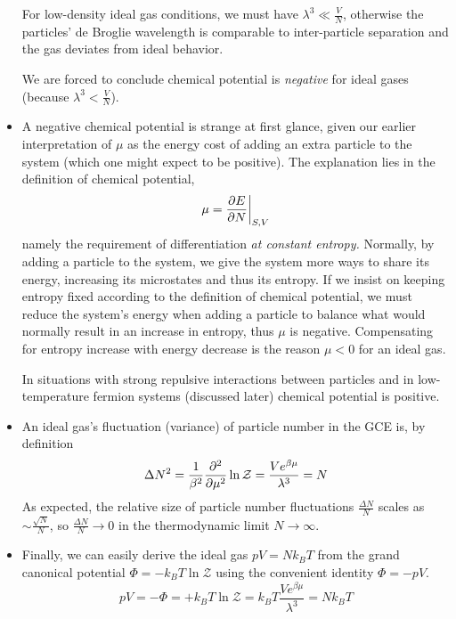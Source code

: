 \documentclass[11pt, a4paper]{article}
\begin{document}
\begin{itemize}
	For low-density ideal gas conditions, we must have $ \lambda^{3} \ll \frac{V}{N} $, otherwise the particles' de Broglie wavelength is comparable to inter-particle separation and the gas deviates from ideal behavior. 
	
	We are forced to conclude chemical potential is \textit{negative} for ideal gases (because $ \lambda^{3} < \frac{V}{N} $). 
	
	\item A negative chemical potential is strange at first glance, given our earlier interpretation of $ \mu $ as the energy cost of adding an extra particle to the system (which one might expect to be positive).  The explanation lies in the definition of chemical potential, 
	\begin{equation*}
		\mu = \pdv{E}{N} \bigg |_{S, V}
	\end{equation*}
	namely the requirement of differentiation \textit{at constant entropy.} Normally, by adding a particle to the system, we give the system more ways to share its energy, increasing its microstates and thus its entropy. If we insist on keeping entropy fixed according to the definition of chemical potential, we must reduce the system's energy when adding a particle to balance what would normally result in an increase in entropy, thus $ \mu $ is negative. Compensating for entropy increase with energy decrease is the reason $ \mu < 0 $ for an ideal gas.
	
	In situations with strong repulsive interactions between particles and in low-temperature fermion systems (discussed later) chemical potential is positive.
	
	\item An ideal gas's fluctuation (variance) of particle number in the GCE is, by definition
	\begin{equation*}
		\Delta N^{2} = \frac{1}{\beta^{2}} \pdv[2]{}{\mu}\ln \mathcal{Z} = \frac{Ve^{\beta \mu}}{\lambda^{3}} =  N
	\end{equation*}
	As expected, the relative size of particle number fluctuations $ \frac{\Delta N}{N} $ scales as $ \sim \frac{\sqrt{N}}{N} $, so $  \frac{\Delta N}{N} \to 0 $ in the thermodynamic limit $ N \to \infty $.
	
	\item Finally, we can easily derive the ideal gas $ pV = Nk_{B}T $ from the grand canonical potential $ \Phi = - k_{B}T \ln \mathcal{Z} $ using the convenient identity $ \Phi = - pV $. 
	\begin{equation*}
		pV = - \Phi = + k_{B}T \ln \mathcal{Z} = k_{B}T \frac{Ve^{\beta \mu}}{\lambda^{3}} =  N k_{B} T 
	\end{equation*}
\end{itemize}
\end{document}
